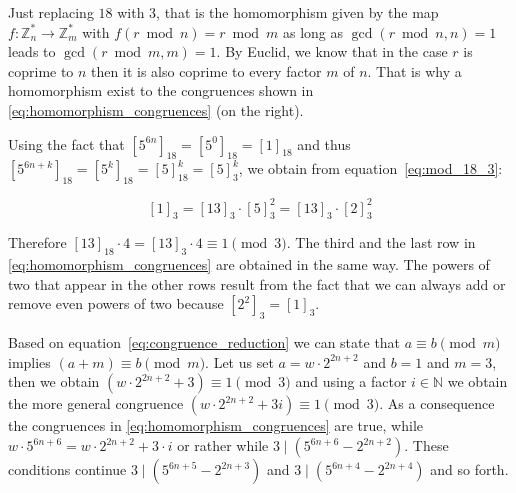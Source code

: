 Just replacing $18$ with $3$, that is the homomorphism given by the map $f:\mathbb{Z}^\ast_n\rightarrow \mathbb{Z}^\ast_m$ with $f(r\bmod n)=r\bmod m$ as long as $\gcd(r\bmod n,n)=1$ leads to $\gcd(r\bmod m,m)=1$. By Euclid, we know that in the case $r$ is coprime to $n$ then it is also coprime to every factor $m$ of $n$. That is why a homomorphism exist to the congruences shown in \ref{eq:homomorphism_congruences} (on the right).

Using the fact that $[5^{6n}]_{18}=[5^0]_{18}=[1]_{18}$ and thus $[5^{6n+k}]_{18}=[5^k]_{18}=[5]_{18}^k=[5]_3^k$, we obtain from equation~\ref{eq:mod_18_3}:

\[
[1]_3=[13]_3\cdot[5]_3^2=[13]_3\cdot[2]_3^2
\]

Therefore $[13]_{18}\cdot4=[13]_3\cdot4\equiv1\pmod{3}$. The third and the last row in \ref{eq:homomorphism_congruences} are obtained in the same way. The powers of two that appear in the other rows result from the fact that we can always add or remove even powers of two because $[2^2]_3=[1]_3$.

Based on equation~\ref{eq:congruence_reduction} we can state that $a\equiv b\pmod m$ implies $(a+m)\equiv b\pmod m$. Let us set $a=w\cdot2^{2n+2}$ and $b=1$ and $m=3$, then we obtain $(w\cdot2^{2n+2}+3)\equiv1\pmod3$ and using a factor $i\in\mathbb{N}$ we obtain the more general congruence $(w\cdot2^{2n+2}+3i)\equiv1\pmod3$. As a consequence the congruences in \ref{eq:homomorphism_congruences} are true, while $w\cdot5^{6n+6}=w\cdot2^{2n+2}+3\cdot i$ or rather while $3\mid(5^{6n+6}-2^{2n+2})$. These conditions continue $3\mid(5^{6n+5}-2^{2n+3})$ and $3\mid(5^{6n+4}-2^{2n+4})$ and so forth.

